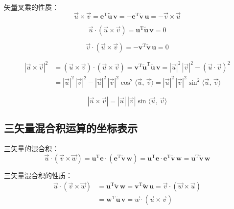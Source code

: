 矢量叉乘的性质：
\begin{equation}
\vec{u} \times \vec{v} = \boldsymbol{e}^{\mathrm{T}} \tilde{\boldsymbol{u}}\, \boldsymbol{v} = -\boldsymbol{e}^{\mathrm{T}} \tilde{\boldsymbol{v}}\, \boldsymbol{u} = -\vec{v} \times \vec{u} \tag{I}
\end{equation}

\begin{equation}
\vec{u} \cdot (\vec{u} \times \vec{v}) = \boldsymbol{u}^{\mathrm{T}} \tilde{\boldsymbol{u}}\, \boldsymbol{v} = 0 \tag{II}
\end{equation}

\begin{equation}
\vec{v} \cdot (\vec{u} \times \vec{v}) = -\boldsymbol{v}^{\mathrm{T}} \tilde{\boldsymbol{v}}\, \boldsymbol{u} = 0 \tag{III}
\end{equation}

\begin{align}
|\vec{u} \times \vec{v}|^2 &= (\vec{u} \times \vec{v}) \cdot (\vec{u} \times \vec{v}) = \boldsymbol{v}^{\mathrm{T}} \tilde{\boldsymbol{u}}^{\mathrm{T}} \tilde{\boldsymbol{u}}\, \boldsymbol{v} = |\vec{u}|^2\, |\vec{v}|^2 - (\vec{u} \cdot \vec{v})^2 \nonumber \\
&= |\vec{u}|^2\, |\vec{v}|^2 - |\vec{u}|^2\, |\vec{v}|^2 \cos^2\langle \vec{u},\, \vec{v} \rangle = |\vec{u}|^2\, |\vec{v}|^2 \sin^2\langle \vec{u},\, \vec{v} \rangle
\end{align}

\begin{equation}
|\vec{u} \times \vec{v}| = |\vec{u}|\, |\vec{v}| \sin\langle \vec{u},\, \vec{v} \rangle \tag{IV}
\end{equation}


\subsection{三矢量混合积运算的坐标表示}

三矢量的混合积：
\begin{equation}\label{eq:4.triple_product}
\vec{u} \cdot (\vec{v} \times \vec{w}) = \boldsymbol{u}^{\mathrm{T}} \boldsymbol{e} \cdot (\boldsymbol{e}^{\mathrm{T}} \tilde{\boldsymbol{v}}\, \boldsymbol{w}) = \boldsymbol{u}^{\mathrm{T}} \boldsymbol{e} \cdot \boldsymbol{e}^{\mathrm{T}} \tilde{\boldsymbol{v}}\, \boldsymbol{w} = \boldsymbol{u}^{\mathrm{T}} \tilde{\boldsymbol{v}}\, \boldsymbol{w}
\end{equation}

三矢量混合积的性质：
\begin{align}
\vec{u} \cdot (\vec{v} \times \vec{w}) &= \boldsymbol{u}^{\mathrm{T}} \tilde{\boldsymbol{v}}\, \boldsymbol{w} = \boldsymbol{v}^{\mathrm{T}} \tilde{\boldsymbol{w}}\, \boldsymbol{u} = \vec{v} \cdot (\vec{w} \times \vec{u}) \nonumber \\
&= \boldsymbol{w}^{\mathrm{T}} \tilde{\boldsymbol{u}}\, \boldsymbol{v} = \vec{w} \cdot (\vec{u} \times \vec{v})
\end{align}


